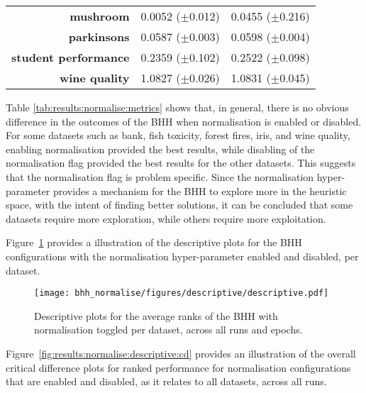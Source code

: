 \begin{table}[htbp]
{\begin{tabular}{r|cc}
			\textbf{mushroom}            & \cellcolor[rgb]{ .388,  .745,  .482}0.0052 ($\pm$0.012)   & \cellcolor[rgb]{ .973,  .412,  .42}0.0455 ($\pm$0.216)  \\
			\textbf{parkinsons}          & \cellcolor[rgb]{ .388,  .745,  .482}0.0587 ($\pm$0.003)   & \cellcolor[rgb]{ .973,  .412,  .42}0.0598 ($\pm$0.004)  \\
			\textbf{student performance} & \cellcolor[rgb]{ .388,  .745,  .482}0.2359 ($\pm$0.102)   & \cellcolor[rgb]{ .973,  .412,  .42}0.2522 ($\pm$0.098)  \\
			\textbf{wine quality}        & \cellcolor[rgb]{ .388,  .745,  .482}1.0827 ($\pm$0.026)   & \cellcolor[rgb]{ .973,  .412,  .42}1.0831 ($\pm$0.045)  \\
		\end{tabular}%
	}
\end{table}%

Table \ref{tab:results:normalise:metrics} shows that, in general, there is no obvious difference in the outcomes of the \acs{BHH} when normalisation is enabled or disabled. For some datasets such as bank, fish toxicity, forest fires, iris, and wine quality, enabling normalisation provided the best results, while disabling of the normalisation flag provided the best results for the other datasets. This suggests that the normalisation flag is problem specific. Since the normalisation hyper-parameter provides a mechanism for the \acs{BHH} to explore more in the heuristic space, with the intent of finding better solutions, it can be concluded that some datasets require more exploration, while others require more exploitation.

Figure~\ref{fig:results:normalise:descriptive:descriptive} provides a illustration of the descriptive plots for the \acs{BHH} configurations with the normalisation hyper-parameter enabled and disabled, per dataset.

\begin{figure}[htbp]
	\centering
	\texttt{[image: bhh\_normalise/figures/descriptive/descriptive.pdf]}
	\caption{Descriptive plots for the average ranks of the \acs{BHH} with normalisation toggled per dataset, across all runs and epochs.}
	\label{fig:results:normalise:descriptive:descriptive}
\end{figure}

Figure~\ref{fig:results:normalise:descriptive:cd} provides an illustration of the overall critical difference plots for ranked performance for normalisation configurations that are enabled and disabled, as it relates to all datasets, across all runs.


